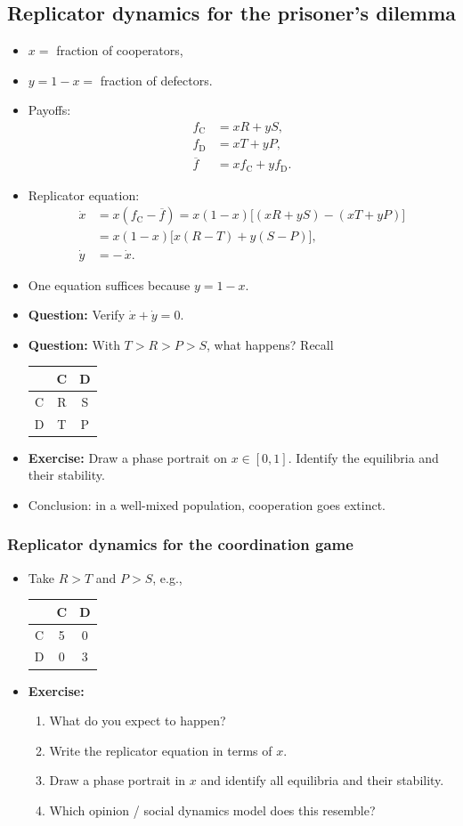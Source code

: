 \documentclass[20pt]{extarticle}
\newcommand{\pdmatrix}[4]{%
\begin{center}
\begin{tabular}{|c||c|c|}
\hline
 & C & D \\
\hline\hline
C & #1 & #2 \\
\hline
D & #3 & #4 \\
\hline
\end{tabular}
\end{center}
}
\begin{document}
\subsection*{Replicator dynamics for the prisoner's dilemma}

\begin{itemize}
\item $x = $ fraction of cooperators,
\item $y = 1-x = $ fraction of defectors.
\item Payoffs:
\[
\begin{aligned}
f_{\text{C}} &= xR + yS,\\
f_{\text{D}} &= xT + yP,\\
\overline{f} &= x f_{\text{C}} + y f_{\text{D}}.
\end{aligned}
\]
\item Replicator equation:
\[
\begin{aligned}
\dot{x} &= x ( f_{\text{C}} - \overline{f} )
= x(1-x)\bigl[(xR+yS) - (xT+yP)\bigr]\\
&= x(1-x)\bigl[x(R-T) + y(S-P)\bigr],\\
\dot{y} &= -\,\dot x.
\end{aligned}
\]
\item One equation suffices because $y = 1-x$.
\item \textbf{Question:} Verify $\dot x + \dot y = 0$.
\item \textbf{Question:} With $T>R>P>S$, what happens? Recall

\pdmatrix{R}{S}{T}{P}

\item \textbf{Exercise:} Draw a phase portrait on $x \in [0,1]$. Identify the equilibria and their stability.
\item Conclusion: in a well-mixed population, cooperation goes extinct.
\end{itemize}

\subsubsection*{Replicator dynamics for the coordination game}

\begin{itemize}
\item Take $R>T$ and $P>S$, e.g.,

\pdmatrix{5}{0}{0}{3}

\item \textbf{Exercise:}
	\begin{enumerate}
	\item What do you expect to happen?
	\item Write the replicator equation in terms of $x$.
	\item Draw a phase portrait in $x$ and identify all equilibria and their stability.
	\item Which opinion / social dynamics model does this resemble?
	\end{enumerate}
\end{itemize}
\end{document}
